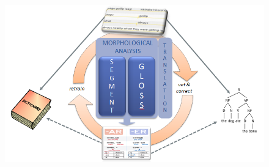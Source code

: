 \documentclass[12pt]{article}
\begin{document}
\begin{figure}[ht]
\label{fig:ML-LDD}
\begin{center}
\includegraphics[width=0.75\columnwidth]{ML-LDD.PNG}
\caption{}
\end{center}
\end{figure}
\end{document}
